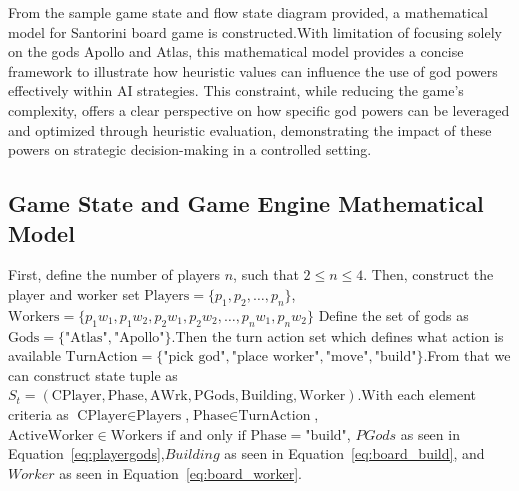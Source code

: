 \documentclass{telkomnika}
\begin{document}
From the sample game state and flow state diagram provided, a mathematical model for Santorini board game is constructed.With limitation of focusing solely on the gods Apollo and Atlas, this mathematical model provides a concise framework to illustrate how heuristic values can influence the use of god powers effectively within AI strategies. This constraint, while reducing the game's complexity, offers a clear perspective on how specific god powers can be leveraged and optimized through heuristic evaluation, demonstrating the impact of these powers on strategic decision-making in a controlled setting.

\subsection{Game State and Game Engine Mathematical Model}
First, define the number of players \(n\), such that \(2 \leq n \leq 4\). Then, construct the player and worker set \( \text{Players} = \{p_1, p_2, \ldots, p_n\} \),\(\text{Workers} = \{p_{1}w_{1},p_{1}w_{2},p_{2}w_{1},p_{2}w_{2}, \ldots, p_{n}w_{1},p_{n}w_{2}\}\) Define the set of gods as \(\text{Gods} = \{\text{"Atlas"}, \text{"Apollo"}\}\).Then the turn action set which defines what action is available \(\text{TurnAction} = \{\text{"pick god"}, \text{"place worker"}, \text{"move"}, \text{"build"}\}\).From that we can construct state tuple as \(S_t = (\text{CPlayer}, \text{Phase}, \text{AWrk}, \text{PGods}, \text{Building}, \text{Worker})\).With each element criteria as \(\text{CPlayer} \in \text{Players}\),\(\text{Phase} \in \text{TurnAction}\),\(\text{ActiveWorker} \in \text{Workers} \text{ if and only if } \text{Phase} = \text{"build"}\), \(PGods\) as seen in Equation~\ref{eq:playergods},\(Building\) as seen in Equation~\ref{eq:board_build}, and \(Worker\) as seen in Equation~\ref{eq:board_worker}.
\end{document}
